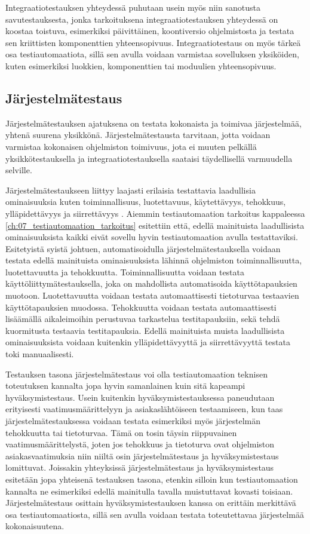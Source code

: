     Integraatiotestauksen yhteydessä puhutaan usein myös niin sanotusta savutestauksesta, jonka tarkoituksena integraatiotestauksen yhteydessä on koostaa toistuva, esimerkiksi päivittäinen, koontiversio ohjelmistosta ja testata sen kriittisten komponenttien yhteensopivuus.
    Integraatiotestaus on myös tärkeä osa testiautomaatiota, sillä sen avulla voidaan varmistaa sovelluksen yksiköiden, kuten esimerkiksi luokkien, komponenttien tai moduulien yhteensopivuus.

  \subsection{Järjestelmätestaus} \label{ch:07_jarjestelmatestaus}

    Järjestelmätestauksen ajatuksena on testata kokonaista ja toimivaa järjestelmää, yhtenä suurena yksikkönä.
    Järjestelmätestausta tarvitaan, jotta voidaan varmistaa kokonaisen ohjelmiston toimivuus, jota ei muuten pelkällä yksikkötestauksella ja integraatiotestauksella saataisi täydellisellä varmuudella selville.

    Järjestelmätestaukseen liittyy laajasti erilaisia testattavia laadullisia ominaisuuksia kuten toiminnallisuus, luotettavuus, käytettävyys, tehokkuus, ylläpidettävyys ja siirrettävyys \parencite{iso_quality_attributes}.
    Aiemmin testiautomaation tarkoitus kappaleessa \ref{ch:07_testiautomaation_tarkoitus} esitettiin että, edellä mainituista laadullisista ominaisuuksista kaikki eivät sovellu hyvin testiautomaation avulla testattaviksi.
    Esitetyistä syistä johtuen, automatisoidulla järjestelmätestauksella voidaan testata edellä mainituista ominaisuuksista lähinnä ohjelmiston toiminnallisuutta, luotettavuutta ja tehokkuutta.
    Toiminnallisuutta voidaan testata käyttöliittymätestauksella, joka on mahdollista automatisoida käyttötapauksien muotoon.
    Luotettavuutta voidaan testata automaattisesti tietoturvaa testaavien käyttötapauksien muodossa.
    Tehokkuutta voidaan testata automaattisesti lisäämällä aikaleimoihin perustuvaa tarkastelua testitapauksiin, sekä tehdä kuormitusta testaavia testitapauksia.
    Edellä mainituista muista laadullisista ominaisuuksista voidaan kuitenkin ylläpidettävyyttä ja siirrettävyyttä testata toki manuaalisesti.


    Testauksen tasona järjestelmätestaus voi olla testiautomaation teknisen toteutuksen kannalta jopa hyvin samanlainen kuin sitä kapeampi hyväksymistestaus.
    Usein kuitenkin hyväksymistestauksessa paneudutaan erityisesti vaatimusmäärittelyyn ja asiakaslähtöiseen testaamiseen, kun taas järjestelmätestauksessa voidaan testata esimerkiksi myös järjestelmän tehokkuutta tai tietoturvaa.
    Tämä on tosin täysin riippuvainen vaatimusmäärittelystä, joten jos tehokkuus ja tietoturva ovat ohjelmiston asiakasvaatimuksia niin niiltä osin järjestelmätestaus ja hyväksymistestaus lomittuvat.
    Joissakin yhteyksissä järjestelmätestaus ja hyväksymistestaus esitetään jopa yhteisenä testauksen tasona, etenkin silloin kun testiautomaation kannalta ne esimerkiksi edellä mainitulla tavalla muistuttavat kovasti toisiaan.
    Järjestelmätestaus osittain hyväksymistestauksen kanssa on erittäin merkittävä osa testiautomaatiosta, sillä sen avulla voidaan testata toteutettavaa järjestelmää kokonaisuutena.

